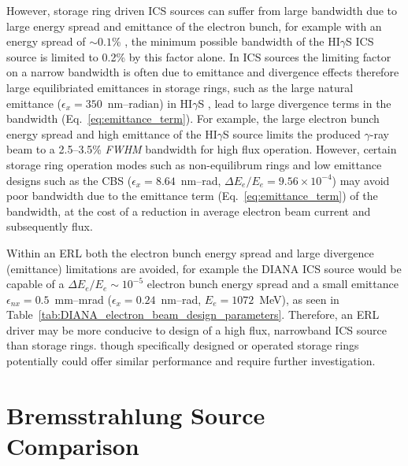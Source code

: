 \documentclass[../main.tex]{subfiles}
\begin{document}
However, storage ring driven ICS sources can suffer from large bandwidth due to large energy spread and emittance of the electron bunch, for example with an energy spread of $\sim0.1$\% \cite{litvinenko1996intense}, the minimum possible bandwidth of the HI$\gamma$S ICS source is limited to 0.2\% by this factor alone. In ICS sources the limiting factor on a narrow bandwidth is often due to emittance and divergence effects therefore large equilibriated emittances in storage rings, such as the large natural emittance ($\epsilon_{x} = 350$~\si{\nano\meter}--\si{radian}) in HI$\gamma$S \cite{weller2009research}, lead to large divergence terms in the bandwidth (Eq.~\ref{eq:emittance_term}). For example, the large electron bunch energy spread and high emittance of the HI$\gamma$S source limits the produced $\gamma$-ray beam to a 2.5--3.5\% \textit{FWHM} bandwidth \cite{weller2009research} for high flux operation. However, certain storage ring operation modes such as non-equilibrum rings \cite{huang1998laser,owen2013nonequilibrium} and low emittance designs such as the CBS \cite{pan2019design} ($\epsilon_{x} = 8.64$~\si{\nano\meter}--\si{\radian}, $\Delta E_{e}/E_{e} = 9.56\times 10^{-4}$) may avoid poor bandwidth due to the emittance term (Eq.~\ref{eq:emittance_term}) of the bandwidth, at the cost of a reduction in average electron beam current and subsequently flux.     

Within an ERL both the electron bunch energy spread and large divergence (emittance) limitations are avoided, for example the DIANA ICS source would be capable of a $\Delta E_{e}/E_{e}\sim10^{-5}$ electron bunch energy spread and a small emittance $\epsilon_{nx} = 0.5$~\si{\milli\meter}--\si{\milli\radian} ($\epsilon_{x} = 0.24$~\si{\nano\meter}--\si{\radian}, $E_{e} = 1072$~\si{\mega\electronvolt}), as seen in Table~\ref{tab:DIANA_electron_beam_design_parameters}. Therefore, an ERL driver may be more conducive to design of a high flux, narrowband ICS source than storage rings. though specifically designed or operated storage rings potentially could offer similar performance and require further investigation.

\section{Bremsstrahlung Source Comparison}
\label{sec:bremsstrahlung_comparison}
\end{document}
